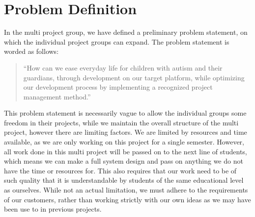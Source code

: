 \section{Problem Definition}
In the multi project group, we have defined a preliminary problem statement, on which the individual project groups can expand.
The problem statement is worded as follows: 
\begin{quotation}
 ``How can we ease everyday life for children with autism and their guardians, through development on our target platform,
 while optimizing our development process by implementing a recognized project management method.''
\end{quotation}

This problem statement is necessarily vague to allow the individual groups some freedom in their projects, while we maintain the overall structure of the multi project, 
however there are limiting factors.
We are limited by resources and time available, as we are only working on this project for a single semester. However, all work done in this multi project
will be passed on to the next line of students, which means we can make a full system design and pass on anything we do not have the time or resources for.
This also requires that our work need to be of such quality that it is understandable by students of the same educational level as ourselves.
While not an actual limitation, we must adhere to the requirements of our customers, rather than working strictly with our own ideas as we may have been use to in previous projects.





  



